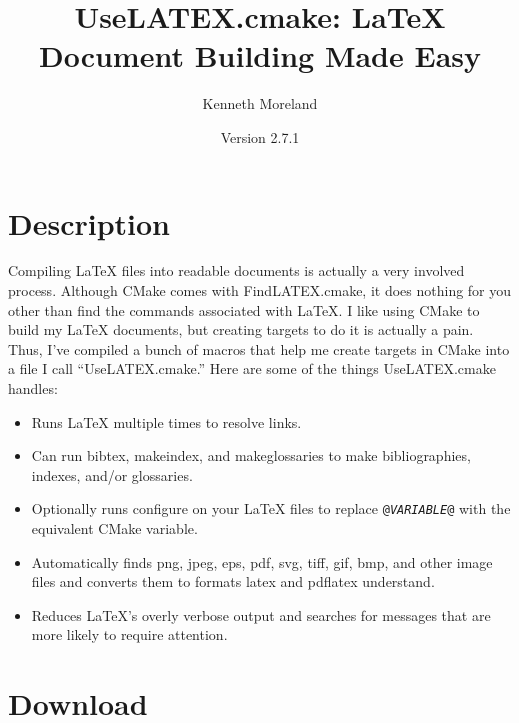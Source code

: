 \documentclass{article}
\newcommand{\UseLATEXVersion}{2.7.1}
\newcommand*{\textfile}[1]{\textsf{#1}}
\newcommand*{\textprog}[1]{\textfile{#1}}
\newcommand*{\textcmake}[1]{\texttt{#1}}
\newcommand*{\textvar}[1]{\textit{#1}}
\newcommand*{\UseLATEX}{\textfile{UseLATEX.cmake}\xspace}
\newcommand*{\latex}{\LaTeX\xspace}
\begin{document}
  \sloppy

  \title{UseLATEX.cmake: \latex Document Building Made Easy}
  \author{Kenneth Moreland}
  \date{Version \UseLATEXVersion}
  \maketitle

  \tableofcontents


  \section{Description}
  \label{sec:Description}

  Compiling \latex files into readable documents is actually a very
  involved process. Although CMake comes with \textfile{FindLATEX.cmake},
  it does nothing for you other than find the commands associated with
  \latex. I like using CMake to build my \latex documents, but creating
  targets to do it is actually a pain. Thus, I've compiled a bunch of
  macros that help me create targets in CMake into a file I call
  ``\UseLATEX.'' Here are some of the things \UseLATEX handles:

  \begin{itemize}
  \item Runs \latex multiple times to resolve links.
  \item Can run \textprog{bibtex}, \textprog{makeindex}, and
    \textprog{makeglossaries} to make bibliographies, indexes, and/or
    glossaries.
  \item Optionally runs configure on your \latex files to replace
    \textcmake{@\textvar{VARIABLE}@} with the equivalent CMake variable.
  \item Automatically finds png, jpeg, eps, pdf, svg, tiff, gif, bmp, and
    other image files and converts them to formats \textprog{latex} and
    \textprog{pdflatex} understand.
  \item Reduces \latex's overly verbose output and searches for messages
    that are more likely to require attention.
  \end{itemize}


  \section{Download}
  \label{sec:Download}
\end{document}

